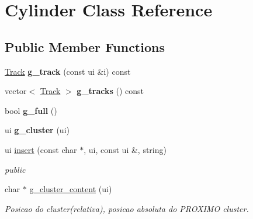 \hypertarget{classCylinder}{}\section{Cylinder Class Reference}
\label{classCylinder}
\subsection*{Public Member Functions}
\begin{DoxyCompactItemize}
\item 
\hyperlink{classTrack}{Track} {\bfseries g\+\_\+track} (const ui \&i) const \hypertarget{classCylinder_ac74dc1f6f1014d040efdaaa0a26ac4e5}{}\label{classCylinder_ac74dc1f6f1014d040efdaaa0a26ac4e5}

\item 
vector$<$ \hyperlink{classTrack}{Track} $>$ {\bfseries g\+\_\+tracks} () const \hypertarget{classCylinder_a23643874c7768d30a095f75376aea448}{}\label{classCylinder_a23643874c7768d30a095f75376aea448}

\item 
bool {\bfseries g\+\_\+full} ()\hypertarget{classCylinder_a894cce14f46d536e3ab2685eaa0f88c1}{}\label{classCylinder_a894cce14f46d536e3ab2685eaa0f88c1}

\item 
ui {\bfseries g\+\_\+cluster} (ui)\hypertarget{classCylinder_a368e9fdfd7b0bb34eaae0d2ea154e9eb}{}\label{classCylinder_a368e9fdfd7b0bb34eaae0d2ea154e9eb}

\item 
ui \hyperlink{classCylinder_a466d02af745ee3e548e4cba1ac752644}{insert} (const char $\ast$, ui, const ui \&, string)
\begin{DoxyCompactList}\small\item\em public \end{DoxyCompactList}\item 
char $\ast$ \hyperlink{classCylinder_a6817b9a3c3f49af8d569f93491f43106}{g\+\_\+cluster\+\_\+content} (ui)\hypertarget{classCylinder_a6817b9a3c3f49af8d569f93491f43106}{}\label{classCylinder_a6817b9a3c3f49af8d569f93491f43106}

\begin{DoxyCompactList}\small\item\em Posicao do cluster(relativa), posicao absoluta do P\+R\+O\+X\+I\+MO cluster. \end{DoxyCompactList}\end{DoxyCompactItemize}
